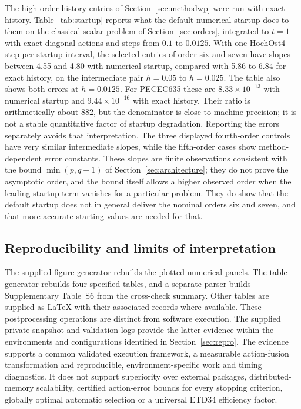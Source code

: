 The high-order history entries of Section~\ref{sec:methodwp} were run with
exact history.  Table~\ref{tab:startup} reports what the default numerical
startup does to them on the classical scalar problem of
Section~\ref{sec:orders}, integrated to $t=1$ with exact diagonal actions and
steps from $0.1$ to $0.0125$.  With one HochOst4 step per startup interval, the
selected entries of order six and seven have slopes between 4.55 and
4.80 with numerical startup, compared with 5.86 to 6.84 for exact history,
on the intermediate pair $h=0.05$ to $h=0.025$.  The table also shows both
errors at $h=0.0125$.  For PECEC635 these are $8.33\times10^{-13}$ with
numerical startup and $9.44\times10^{-16}$ with exact history.  Their ratio
is arithmetically about 882, but the denominator is close to machine precision;
it is not a stable quantitative factor of startup degradation.  Reporting the
errors separately avoids that interpretation.  The three displayed fourth-order
controls have very similar intermediate slopes, while the fifth-order cases
show method-dependent error constants.  These slopes are finite
observations consistent with the bound $\min(p,q+1)$ of
Section~\ref{sec:architecture}; they do not prove the asymptotic order, and
the bound itself allows a higher observed order when the leading startup term
vanishes for a particular problem.  They do show that the default startup
does not in general deliver the nominal orders six and seven, and that more
accurate starting values are needed for that.


\subsection{Reproducibility and limits of interpretation}\label{sec:reprolimits}

The supplied figure generator rebuilds the plotted numerical panels.
The table generator rebuilds four specified tables, and a separate parser
builds Supplementary Table~S6 from the cross-check summary.  Other tables
are supplied as LaTeX with their associated records where available.  These
postprocessing operations are distinct from software execution.  The
supplied private snapshot and validation logs provide the latter evidence
within the environments and configurations identified in Section~\ref{sec:repro}.  The evidence
supports a common validated execution framework, a measurable action-fusion
transformation and reproducible, environment-specific work and timing
diagnostics.  It does not support superiority over external packages,
distributed-memory scalability, certified action-error bounds for every
stopping criterion, globally optimal automatic selection or a universal ETD34
efficiency factor.
